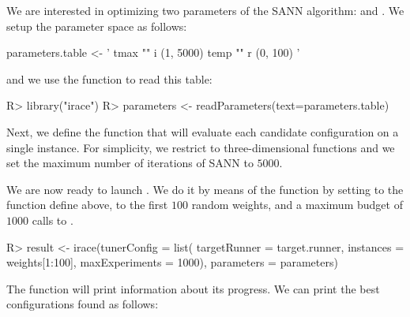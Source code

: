 \documentclass[article,a4paper,nojss,notitle]{jss}
\newcommand{\irace}{\pkg{irace}\xspace}
\begin{document}
We are interested in optimizing two parameters of the SANN algorithm:  and . We setup the parameter space as follows:

\begin{CodeInput}
parameters.table <- '
tmax "" i (1, 5000)
temp "" r (0, 100)
'
\end{CodeInput}

and we use the \irace function  to read this table:

\begin{CodeInput}
R> library("irace")
R> parameters <- readParameters(text=parameters.table)
\end{CodeInput}

Next, we define the function that will evaluate each candidate
configuration on a single instance. For simplicity, we restrict to
three-dimensional functions and we set the maximum number of
iterations of SANN to $5000$.


We are now ready to launch \irace. We do it by means of the
 function by setting  to the function define
above,  to the first $100$ random weights, and a
maximum budget of $1000$ calls to .

\begin{CodeChunk}
\begin{CodeInput}
R> result <- irace(tunerConfig = list(
                    targetRunner = target.runner,
                    instances = weights[1:100],
                    maxExperiments = 1000),
                  parameters = parameters)
\end{CodeInput}
\end{CodeChunk}

The function  will print information about its progress. We can print the best configurations found as follows:
\end{document}
